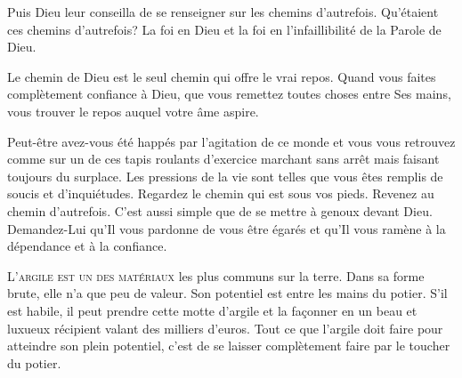 Puis Dieu leur conseilla de
 \og se renseigner sur les chemins d'autrefois. \fg{}
 Qu'étaient ces chemins d'autrefois? La foi en Dieu et la foi
 en l'infaillibilité de la Parole de Dieu. 


Le chemin de Dieu est le seul chemin qui offre le vrai repos.
 Quand vous faites complètement confiance à Dieu,
 que vous remettez toutes choses entre Ses mains,
 vous trouver le repos auquel votre âme aspire. 

Peut-être avez-vous été happés par l'agitation de ce monde
 et vous vous retrouvez comme sur un de ces tapis roulants d'exercice
 \ocadr marchant sans arrêt mais faisant toujours du surplace.
 Les pressions de la vie sont telles que vous êtes remplis de soucis
 et d'inquiétudes. Regardez le chemin qui est sous vos pieds.
 Revenez au chemin d'autrefois. C'est aussi simple que de se mettre
 à genoux devant Dieu. Demandez-Lui qu'Il vous pardonne de vous
 être égarés et qu'Il vous ramène à la dépendance et à la confiance. 


\dvrule






\lettrine{L}{'argile est un des matériaux} les plus communs sur la terre.
 Dans sa forme brute, elle n'a que peu de valeur.
 Son potentiel est entre les mains du potier.
 S'il est habile, il peut prendre cette motte d'argile et la façonner
 en un beau et luxueux récipient valant des milliers d'euros.
 Tout ce que l'argile doit faire pour atteindre son plein potentiel,
 c'est de se laisser complètement faire par le toucher du potier. 

